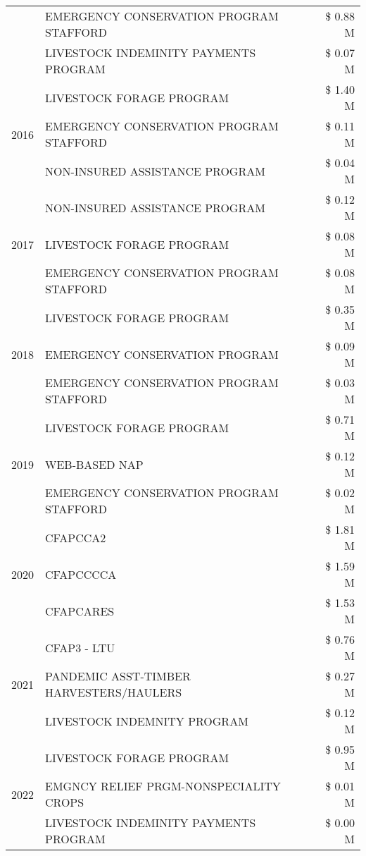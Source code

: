 \begin{tabular}{llr}
 & EMERGENCY CONSERVATION PROGRAM STAFFORD & \$ 0.88 M \\
 & LIVESTOCK INDEMINITY PAYMENTS PROGRAM & \$ 0.07 M \\
\cline{1-3}
\multirow[t]{3}{*}{2016} & LIVESTOCK FORAGE PROGRAM & \$ 1.40 M \\
 & EMERGENCY CONSERVATION PROGRAM STAFFORD & \$ 0.11 M \\
 & NON-INSURED ASSISTANCE PROGRAM & \$ 0.04 M \\
\cline{1-3}
\multirow[t]{3}{*}{2017} & NON-INSURED ASSISTANCE PROGRAM & \$ 0.12 M \\
 & LIVESTOCK FORAGE PROGRAM & \$ 0.08 M \\
 & EMERGENCY CONSERVATION PROGRAM STAFFORD & \$ 0.08 M \\
\cline{1-3}
\multirow[t]{3}{*}{2018} & LIVESTOCK FORAGE PROGRAM & \$ 0.35 M \\
 & EMERGENCY CONSERVATION PROGRAM & \$ 0.09 M \\
 & EMERGENCY CONSERVATION PROGRAM STAFFORD & \$ 0.03 M \\
\cline{1-3}
\multirow[t]{3}{*}{2019} & LIVESTOCK FORAGE PROGRAM & \$ 0.71 M \\
 & WEB-BASED NAP & \$ 0.12 M \\
 & EMERGENCY CONSERVATION PROGRAM STAFFORD & \$ 0.02 M \\
\cline{1-3}
\multirow[t]{3}{*}{2020} & CFAPCCA2 & \$ 1.81 M \\
 & CFAPCCCCA & \$ 1.59 M \\
 & CFAPCARES & \$ 1.53 M \\
\cline{1-3}
\multirow[t]{3}{*}{2021} & CFAP3 - LTU & \$ 0.76 M \\
 & PANDEMIC ASST-TIMBER HARVESTERS/HAULERS & \$ 0.27 M \\
 & LIVESTOCK INDEMNITY PROGRAM & \$ 0.12 M \\
\cline{1-3}
\multirow[t]{3}{*}{2022} & LIVESTOCK FORAGE PROGRAM & \$ 0.95 M \\
 & EMGNCY RELIEF PRGM-NONSPECIALITY CROPS & \$ 0.01 M \\
 & LIVESTOCK INDEMINITY PAYMENTS PROGRAM & \$ 0.00 M \\
\cline{1-3}
\bottomrule
\end{tabular}
